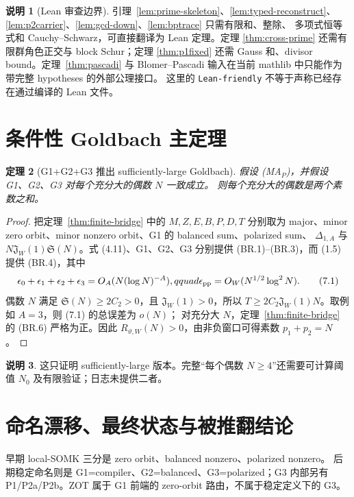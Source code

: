 \documentclass[11pt,a4paper]{ctexart}
\newtheorem{theorem}{定理}[section]
\theoremstyle{definition}
\newtheorem{remark}[theorem]{说明}
\newcommand{\1}{\mathbf 1}
\begin{document}
\begin{remark}[Lean 审查边界]
引理~\ref{lem:prime-skeleton}、\ref{lem:typed-reconstruct}、
\ref{lem:p2carrier}、\ref{lem:gcd-down}、\ref{lem:bptrace} 只需有限和、整除、
多项式恒等式和 Cauchy--Schwarz，可直接翻译为 Lean 定理。定理
\ref{thm:cross-prime} 还需有限群角色正交与 block Schur；定理
\ref{thm:p1fixed} 还需 Gauss 和、divisor bound。定理~\ref{thm:pascadi} 与
Blomer--Pascadi 输入在当前 mathlib 中只能作为带完整 hypotheses 的外部公理接口。
这里的 \texttt{Lean-friendly} 不等于声称已经存在通过编译的 Lean 文件。
\end{remark}

\section{条件性 Goldbach 主定理}

\begin{theorem}[G1+G2+G3 推出 sufficiently-large Goldbach]
假设 \textup{(MA$_P$)}，并假设 G1、G2、G3 对每个充分大的偶数 $N$ 一致成立。
则每个充分大的偶数是两个素数之和。
\end{theorem}

\begin{proof}
把定理~\ref{thm:finite-bridge} 中的 $M,Z,E,B,P,D,T$ 分别取为 major、minor
zero orbit、minor nonzero orbit、G1 的 balanced sum、polarized sum、
$\Delta_{1,A}$ 与
$N\mathfrak J_W(1)\mathfrak S(N)$。式 (4.11)、G1、G2、G3 分别提供
(BR.1)--(BR.3)，而 (1.5) 提供 (BR.4)，其中
\[
\epsilon_0+\epsilon_1+\epsilon_2+\epsilon_3
=O_A(N(\log N)^{-A}),qquad
\epsilon_{\rm pp}=O_W(N^{1/2}\log^2N).                \tag{7.1}
\]
偶数 $N$ 满足 $\mathfrak S(N)\ge2C_2>0$，且
$\mathfrak J_W(1)>0$，所以
$T\ge2C_2\mathfrak J_W(1)N$。取例如 $A=3$，则 (7.1) 的总误差为 $o(N)$；
对充分大 $N$，定理~\ref{thm:finite-bridge} 的 (BR.6) 严格为正。因此
$R_{\vartheta,W}(N)>0$，由非负窗口可得素数 $p_1+p_2=N$。
\end{proof}

\begin{remark}
这只证明 sufficiently-large 版本。完整“每个偶数 $N\ge4$”还需要可计算阈值
$N_0$ 及有限验证；日志未提供二者。
\end{remark}

\section{命名漂移、最终状态与被推翻结论}

早期 local-SOMK 三分是 zero orbit、balanced nonzero、polarized nonzero。
后期稳定命名则是 G1=compiler、G2=balanced、G3=polarized；G3 内部另有
P1/P2a/P2b。ZOT 属于 G1 前端的 zero-orbit 路由，不属于稳定定义下的 G3。
\end{document}
